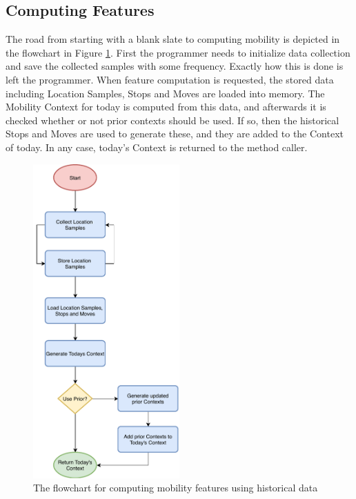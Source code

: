 \subsection{Computing Features}
The road from starting with a blank slate to computing mobility is depicted in the flowchart in Figure \ref{fig:flowchart-features}. First the programmer needs to initialize data collection and save the collected samples with some frequency. Exactly how this is done is left the programmer. When feature computation is requested, the stored data including Location Samples, Stops and Moves are loaded into memory. The Mobility Context for today is computed from this data, and afterwards it is checked whether or not prior contexts should be used. If so, then the historical Stops and Moves are used to generate these, and they are added to the Context of today. In any case, today's Context is returned to the method caller.

\begin{figure}
    \centering
    \includegraphics[width=0.5\textwidth]{images/diagrams/api-flowchart.pdf}
    \caption{The flowchart for computing mobility features using historical data}
    \label{fig:flowchart-features}
\end{figure}


